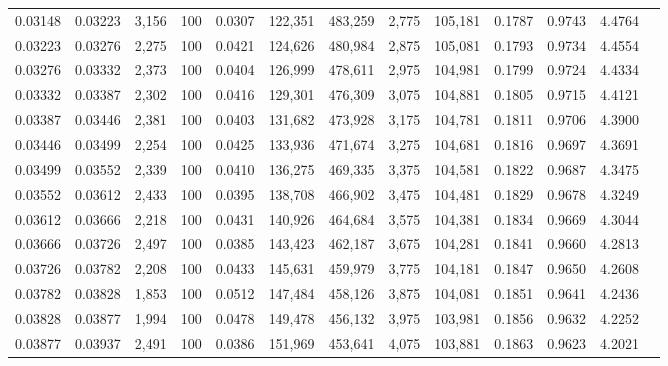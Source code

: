 \begin{tabular}{rrrrrrrrrrrrr}
0.03148 & 0.03223 & 3,156 & 100 &                                     0.0307 & 122,351 & 483,259 &   2,775 & 105,181 & 0.1787 & 0.9743 & 4.4764 \\
0.03223 & 0.03276 & 2,275 & 100 &                                     0.0421 & 124,626 & 480,984 &   2,875 & 105,081 & 0.1793 & 0.9734 & 4.4554 \\
0.03276 & 0.03332 & 2,373 & 100 &                                     0.0404 & 126,999 & 478,611 &   2,975 & 104,981 & 0.1799 & 0.9724 & 4.4334 \\
0.03332 & 0.03387 & 2,302 & 100 &                                     0.0416 & 129,301 & 476,309 &   3,075 & 104,881 & 0.1805 & 0.9715 & 4.4121 \\
0.03387 & 0.03446 & 2,381 & 100 &                                     0.0403 & 131,682 & 473,928 &   3,175 & 104,781 & 0.1811 & 0.9706 & 4.3900 \\
0.03446 & 0.03499 & 2,254 & 100 &                                     0.0425 & 133,936 & 471,674 &   3,275 & 104,681 & 0.1816 & 0.9697 & 4.3691 \\
0.03499 & 0.03552 & 2,339 & 100 &                                     0.0410 & 136,275 & 469,335 &   3,375 & 104,581 & 0.1822 & 0.9687 & 4.3475 \\
0.03552 & 0.03612 & 2,433 & 100 &                                     0.0395 & 138,708 & 466,902 &   3,475 & 104,481 & 0.1829 & 0.9678 & 4.3249 \\
0.03612 & 0.03666 & 2,218 & 100 &                                     0.0431 & 140,926 & 464,684 &   3,575 & 104,381 & 0.1834 & 0.9669 & 4.3044 \\
0.03666 & 0.03726 & 2,497 & 100 &                                     0.0385 & 143,423 & 462,187 &   3,675 & 104,281 & 0.1841 & 0.9660 & 4.2813 \\
0.03726 & 0.03782 & 2,208 & 100 &                                     0.0433 & 145,631 & 459,979 &   3,775 & 104,181 & 0.1847 & 0.9650 & 4.2608 \\
0.03782 & 0.03828 & 1,853 & 100 &                                     0.0512 & 147,484 & 458,126 &   3,875 & 104,081 & 0.1851 & 0.9641 & 4.2436 \\
0.03828 & 0.03877 & 1,994 & 100 &                                     0.0478 & 149,478 & 456,132 &   3,975 & 103,981 & 0.1856 & 0.9632 & 4.2252 \\
0.03877 & 0.03937 & 2,491 & 100 &                                     0.0386 & 151,969 & 453,641 &   4,075 & 103,881 & 0.1863 & 0.9623 & 4.2021 \\

\end{tabular}
